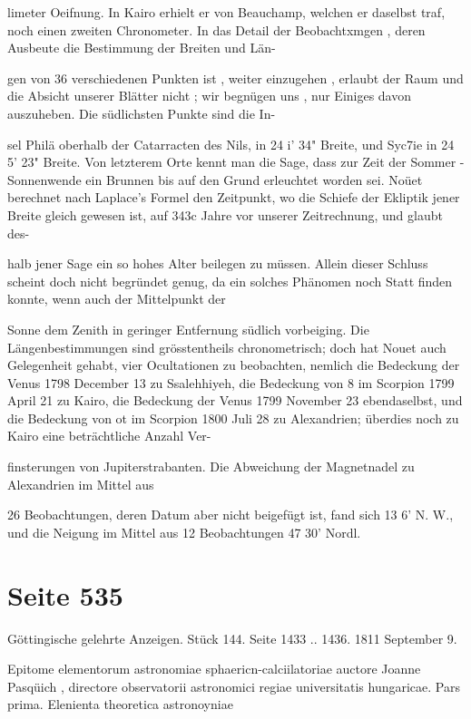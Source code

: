 \documentclass[10pt,a4paper]{article}
\begin{document}
limeter Oeifnung. In Kairo erhielt er von Beauchamp, welchen er daselbst traf, noch einen zweiten Chronometer. In das Detail der Beobachtxmgen , deren Ausbeute die Bestimmung der Breiten und Län-

gen von 36 verschiedenen Punkten ist , weiter einzugehen , erlaubt der Raum und die Absicht unserer Blätter nicht ; wir begnügen uns , nur Einiges davon auszuheben. Die südlichsten Punkte sind die In-

sel Philä oberhalb der Catarracten des Nils, in 24\textdegree{} i' 34" Breite, und Syc7ie in 24\textdegree{} 5' 23" Breite. Von letzterem Orte kennt man die Sage, dass zur Zeit der Sommer -Sonnenwende ein Brunnen bis auf den Grund erleuchtet worden sei. Noüet berechnet nach Laplace's Formel den Zeitpunkt, wo die Schiefe der Ekliptik jener Breite gleich gewesen ist, auf 343c Jahre vor unserer Zeitrechnung, und glaubt des-

halb jener Sage ein so hohes Alter beilegen zu müssen. Allein dieser Schluss scheint doch nicht begründet genug, da ein solches Phänomen noch Statt finden konnte, wenn auch der Mittelpunkt der

Sonne dem Zenith in geringer Entfernung südlich vorbeiging. Die Längenbestimmungen sind grösstentheils chronometrisch; doch hat Nouet auch Gelegenheit gehabt, vier Ocultationen zu beobachten, nemlich die Bedeckung der Venus 1798 December 13 zu Ssalehhiyeh, die Bedeckung von 8 im Scorpion 1799 April 21 zu Kairo, die Bedeckung der Venus 1799 November 23 ebendaselbst, und die Bedeckung von ot im Scorpion 1800 Juli 28 zu Alexandrien; überdies noch zu Kairo eine beträchtliche Anzahl Ver-

finsterungen von Jupiterstrabanten. Die Abweichung der Magnetnadel zu Alexandrien im Mittel aus

26 Beobachtungen, deren Datum aber nicht beigefügt ist, fand sich 13\textdegree{} 6' N. W., und die Neigung im Mittel aus 12 Beobachtungen 47\textdegree{} 30' Nordl.


\newpage
\section*{Seite 535}
Göttingische gelehrte Anzeigen. Stück 144. Seite 1433 .. 1436. 1811 September 9.

Epitome elementorum astronomiae sphaericn-calciilatoriae auctore Joanne Pasqüich , directore observatorii astronomici regiae universitatis hungaricae. Pars prima. Elenienta theoretica astronoyniae
\end{document}
